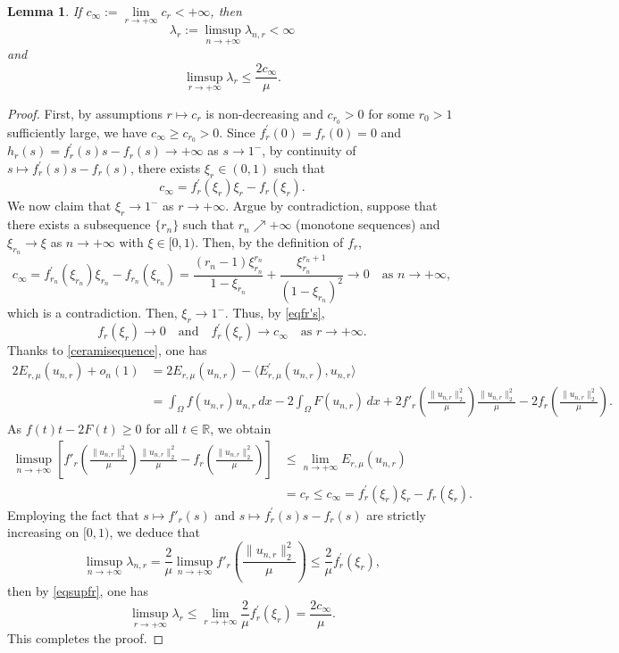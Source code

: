 \documentclass[11pt]{amsart}
\newtheorem{lemma}[theorem]{Lemma}
\newcommand{\norm}[1]{\lVert#1\rVert}
\newcommand{\R}{\mathbb{R}}
\numberwithin{equation}{section}
\begin{document}
\begin{lemma}\label{lemlambdanr}
If $c_\infty:=\lim\limits_{r\to+\infty} c_r <+\infty$, then
$$
\lambda_{r}:= \limsup_{n \rightarrow+ \infty} \lambda_{n,r} < \infty
$$
and
$$
\limsup_{r \rightarrow+ \infty}\lambda_{r} \leq \frac{2c_\infty}{\mu}.
$$
\end{lemma}
\begin{proof}
 First, by assumptions $r \mapsto c_r$ is non-decreasing and  $c_{r_0} >0$ for some $r_0>1$ sufficiently large, we have $c_\infty \geq c_{r_0} >0$. Since $f_{r}^{\prime}(0)=f_{r}(0)=0$ and $h_r(s)=f_{r}^{\prime}(s) s-f_{r}(s) \to +\infty$ as $s \to 1^{-}$, by continuity of $s \mapsto f_{r}^{\prime}(s) s-f_{r}(s)$, there exists $\xi_{r} \in (0,1)$ such that
$$
c_{\infty}=f_{r}^{\prime}(\xi_{r})\xi_{r}-f_{r}(\xi_{r}).
$$
We now claim that $\xi_{r}\to 1^{-}$ as $r \to +\infty$. Argue by contradiction, suppose that there exists a subsequence $\{r_{n}\}$ such that $r_{n} \nearrow +\infty$ (monotone sequences) and $\displaystyle \xi_{r_n}\to \xi$ as $n \to +\infty$ with $\xi \in [0,1)$. Then, by the definition of $f_{r}$,
$$c_{\infty}=f_{r_n}^{\prime}(\xi_{r_n})\xi_{r_n}-f_{r_n}(\xi_{r_n})=\frac{(r_n-1) \xi_{r_n}^{r_n}}{1-\xi_{r_n}}+\frac{\xi_{r_n}^{r_n+1}}{(1-\xi_{r_n})^{2}} \to 0\quad \text{as } n\to +\infty,$$
which is a contradiction. Then, $\xi_{r}\to 1^{-}$. Thus, by \eqref{eqfr's},
\begin{equation}\label{eqsupfr}
 f_{r}(\xi_{r}) \to 0\quad \text{and}\quad  f_{r}^{\prime}(\xi_{r}) \to c_{\infty}\quad \text{as } r\to +\infty.
\end{equation}
Thanks to \eqref{ceramisequence}, one has
$$
\begin{aligned}
 2 E_{r, \mu}(u_{n,r})+ o_{n}(1) &= 2 E_{r, \mu}(u_{n,r})- \langle E_{r,\mu}^{\prime}(u_{n,r}), u_{n,r}\rangle\\
& =\int_{\Omega}f(u_{n,r})u_{n,r}\,dx-2\int_{\Omega}F(u_{n,r})\,dx+2f'_r\left(\frac{\norm{u_{n,r}}_2^2}{\mu}\right)\frac{\norm{u_{n,r}}^2_{2}}{\mu}-2f_r\left(\frac{\norm{u_{n,r}}_2^2}{\mu}\right).
\end{aligned}
$$
As $f(t)t-2F(t) \geq 0$ for all $t \in \R$, we obtain
$$
\begin{aligned}
 \limsup_{n \to +\infty}\left[f'_r\left(\frac{\norm{u_{n,r}}_2^2}{\mu}\right)\frac{\norm{u_{n,r}}^2_{2}}{\mu}-f_r\left(\frac{\norm{u_{n,r}}_2^2}{\mu}\right)\right] &\leq \lim_{n \to +\infty} E_{r, \mu}(u_{n,r}) \\
& =c_{r} \leq c_{\infty}=f_{r}^{\prime}(\xi_{r}) \xi_{r}-f_{r}(\xi_{r}).
\end{aligned}
$$
Employing the fact that $s \mapsto f'_{r}(s)$ and  $s \mapsto f_{r}^{\prime}(s) s-f_{r}(s)$ are strictly increasing on $[0,1)$, we deduce that
$$
\limsup _{n \to +\infty} \lambda_{n,r}=\frac{2}{\mu} \limsup _{n \to +\infty} f'_r\left(\frac{\norm{u_{n,r}}_2^2}{\mu}\right) \leq \frac{2}{\mu} f_{r}^{\prime}\left(\xi_{r}\right),
$$
then by \eqref{eqsupfr}, one has
$$
\limsup _{r \to +\infty} \lambda_{r} \leq \lim_{r \to +\infty}\frac{2}{\mu} f_{r}^{\prime}\left(\xi_{r}\right) = \frac{2c_{\infty}}{\mu}.
$$
This completes the proof.
\end{proof}
\end{document}
